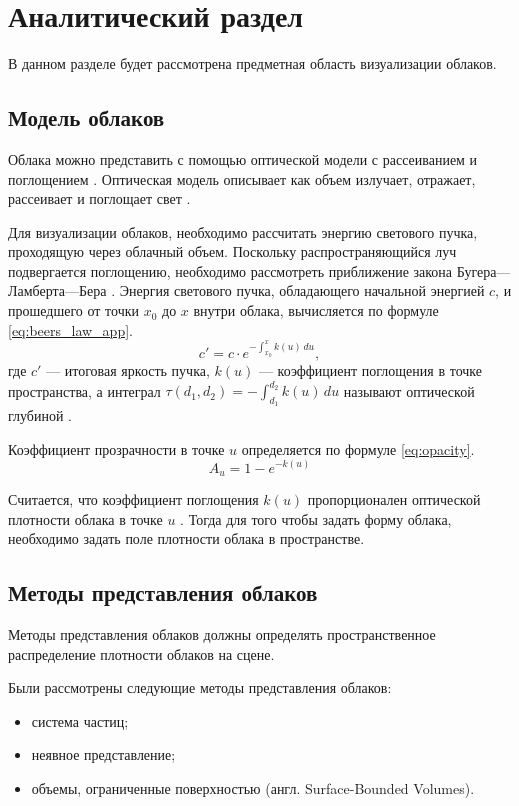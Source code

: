 \chapter{Аналитический раздел}

В данном разделе будет рассмотрена предметная область визуализации облаков.

\section{Модель облаков}
\label{math}
Облака можно представить с помощью оптической модели с рассеиванием и поглощением \cite{partmedia, frostbite, hzd, clouds}.
Оптическая модель описывает как объем излучает, отражает, рассеивает и поглощает свет \cite{rtvg}.

Для визуализации облаков, необходимо рассчитать энергию светового пучка, проходящую через облачный объем. Поскольку распространяющийся луч подвергается поглощению, необходимо рассмотреть приближение закона Бугера---Ламберта---Бера \cite{partmedia, rtvg}. Энергия светового пучка, обладающего начальной энергией $c$, и прошедшего от точки $x_0$ до $x$ внутри облака, вычисляется по формуле \eqref{eq:beers_law_app}.
\begin{equation}
	\label{eq:beers_law_app}
	c' = c \cdot e^{-\int_{x_0}^{x} k(u)\,du},
\end{equation}
где $c'$ --- итоговая яркость пучка, $k(u)$ --- коэффициент поглощения в точке пространства, а интеграл $\tau (d_1, d_2) = -\int_{d_1}^{d_2} k(u)\,du$ называют оптической глубиной \cite{partmedia, rtvg, hzd, frostbite}.

Коэффициент прозрачности в точке $u$ определяется по формуле \eqref{eq:opacity}.
\begin{equation}
	\label{eq:opacity}
	A_u = 1 - e^{-k(u)}
\end{equation}

Считается, что коэффициент поглощения $k(u)$ пропорционален оптической плотности облака в точке $u$ \cite{partmedia, rtvg, hzd, frostbite}. Тогда для того чтобы задать форму облака, необходимо задать поле плотности облака в пространстве.  


\section{Методы представления облаков}
Методы представления облаков должны определять пространственное распределение плотности облаков на сцене.

Были рассмотрены следующие методы представления облаков:
\begin{itemize}
	\item система частиц;
	\item неявное представление;
	\item объемы, ограниченные поверхностью (англ. Surface-Bounded Volumes).
\end{itemize}

